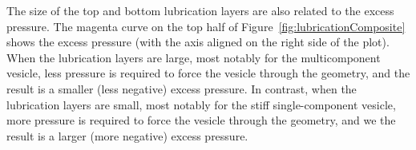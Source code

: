 \documentclass[twoside,twocolumn,9pt]{article}
\newcommand{\subfigimg}[3][,]{%
  \setbox1=\hbox{\texttt{[image: \#3]}}%
  \leavevmode\rlap{\usebox1}%
  \rlap{\hspace*{0pt}\raisebox{\dimexpr\ht1-0\baselineskip}{\bf
  \normalsize #2}}%
  \phantom{\usebox1}%
}
\begin{document}

The size of the top and bottom lubrication layers are also related to
the excess pressure. The magenta curve on the top half of
Figure~\ref{fig:lubricationComposite} shows the excess pressure (with the
axis aligned on the right side of the plot). When the lubrication layers
are large, most notably for the multicomponent vesicle, less pressure is
required to force the vesicle through the geometry, and the result is a
smaller (less negative) excess pressure. In contrast, when the
lubrication layers are small, most notably for the stiff
single-component vesicle, more pressure is required to force the vesicle
through the geometry, and we the result is a larger (more negative)
excess pressure.
\end{document}
